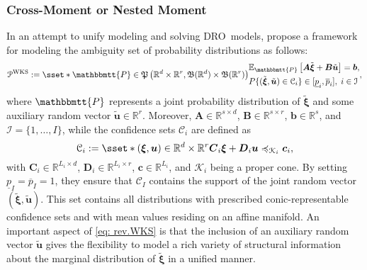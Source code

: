 \documentclass[final,onefignum,onetabnum]{class}
\newcommand{\ee}[2]{\mathbb{E}_{#1} \left[ #2 \right]}
\newcommand{\bs}[1]{\boldsymbol{#1}} %
\newcommand{\Bs}[1]{\mathbb{#1}} %
\newcommand{\Ts}[1]{\mathbbmtt{#1}} %
\newcommand{\Cs}[1]{\mathcal{#1}} %
\newcommand{\Fs}[1]{\mathfrak{#1}} %
\newcommand{\txi}{\tilde{\bs{\xi}}}
\newcommand{\tbs}[1]{\tilde{\bs{#1}}}
\newcommand{\ul}[1]{\underline{#1}}
\newcommand{\ol}[1]{\overline{#1}}
\newcommand{\proprobspace}[2]{\left( \Bs{R}^{#1} \times \Bs{R}^{#2}, \Fs{B}(\Bs{R}^{#1}) \times \Fs{B}(\Bs{R}^{#2}) \right)}
\newcommand{\pprobset}[2]{\Fs{P}\left( \Bs{R}^{#1} \times \Bs{R}^{#2}, \Fs{B}(\Bs{R}^{#1}) \times \Fs{B}(\Bs{R}^{#2}) \right)}
\newcommand{\dro}{DRO}
\begin{document}
\subsubsection{Cross-Moment or Nested Moment}
\label{sec: rev.Wiesemann}

In an attempt to unify modeling and solving \dro\ models, \citet{wiesemann2014} propose a  framework for modeling the ambiguity set of probability distributions as follows:
\begin{equation}
	\label{eq: rev.WKS}
	\Cs{P}^{\text{WKS}}:=\sset*{\Ts{P}\in\pprobset{d}{r}}{ 
		\begin{aligned}  
			& \ee{\Ts{P}}{\bs{A}\txi +\bs{B} \tbs{u}}=\bs{b},\\
			& P\{(\txi,\tbs{u}) \in \Cs{C}_{i} \} \in [\ul{p}_{i}, \ol{p}_{i}], \; i \in \Cs{I}
		\end{aligned}  
	},
\end{equation} 
where $\Ts{P}$ represents a joint probability distribution of $\txi$ and some auxiliary random vector $\tbs{u} \in \Bs{R}^{r}$. Moreover, $\bs{A} \in \Bs{R}^{s \times d}$, $\bs{B} \in \Bs{R}^{s \times r}$, $\bs{b} \in \Bs{R}^{s}$, and $\Cs{I}=\{1, \ldots, I\}$, while the confidence sets $\Cs{C}_{i}$ are defined as 
\begin{equation}
\label{eq: rev.WKS_Cone}
\Cs{C}_{i}:=\sset*{(\bs{\xi},\bs{u}) \in \Bs{R}^{d} \times \Bs{R}^{r} }{\bs{C}_{i} \bs{\bs{\xi}} + \bs{D}_{i} \bs{u} \preccurlyeq_{\Cs{K}_{i}} \bs{c}_{i}},
\end{equation}
with  $\bs{C}_{i} \in \Bs{R}^{L_{i} \times d}$, $\bs{D}_{i} \in \Bs{R}^{L_{i} \times r}$, $\bs{c} \in \Bs{R}^{L_{i}}$, and $\Cs{K}_{i}$ being a proper cone. 
By setting $\ul{p}_{I}=\ol{p}_{I}=1$, they ensure that $\Cs{C}_{I}$ contains the support of  the joint random vector $(\txi,\tbs{u})$. 
This set contains all distributions with prescribed conic-representable
confidence sets and with mean values residing on
an affine manifold. 
An important aspect of \eqref{eq: rev.WKS} is that the  inclusion of an auxiliary random
vector $\tbs{u}$ gives the flexibility to model a rich variety of structural
information about the marginal distribution of $\txi$ in a unified
manner. 
\end{document}
